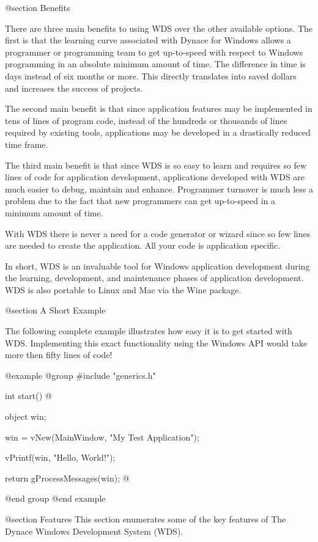 @section Benefits

There are three main benefits to using WDS over the other available
options.  The first is that the learning curve associated with Dynace
for Windows allows a programmer or programming team to get up-to-speed
with respect to Windows programming in an absolute minimum amount of
time.  The difference in time is days instead of six months or more.
This directly translates into saved dollars and increases the success of
projects.

The second main benefit is that since application features may be
implemented in tens of lines of program code, instead of the hundreds or
thousands of lines required by existing tools, applications may be
developed in a drastically reduced time frame.

The third main benefit is that since WDS is so easy to learn and
requires so few lines of code for application development, applications
developed with WDS are much easier to debug, maintain and enhance.
Programmer turnover is much less a problem due to the fact that new
programmers can get up-to-speed in a minimum amount of time.

With WDS there is never a need for a code generator or wizard since
so few lines are needed to create the application.  All your code
is application specific.

In short, WDS is an invaluable tool for Windows application development
during the learning, development, and maintenance phases of application
development.  WDS is also portable to Linux and Mac via the Wine package.

@section A Short Example

The following complete example illustrates how easy it is to get started
with WDS.  Implementing this exact functionality using the Windows API
would take more then fifty lines of code!

@example
@group
#include "generics.h"

int     start()
@{
        object  win;

        win = vNew(MainWindow, "My Test Application");

        vPrintf(win, "Hello, World!\n");

        return gProcessMessages(win);
@}
@end group
@end example



@section Features
This section enumerates some of the key features of The Dynace Windows
Development System (WDS).

